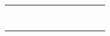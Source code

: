 \documentclass{book}
\begin{document}
\begin{center}
\begin{tabular}{|c|c|c|c|c|c|c|c|c|c|c|c }
        \cline{1-10}
        & & & & & & & & & & \\
        \cline{1-10}
        & & & & & & & & & & \\
        \cline{1-10}
        & & & & & & & & & & \\
        \cline{1-10}
        & & & & & & & & & & \\
        \cline{1-10}
        & & & & & & & & & & \\
        \cline{1-10}
        & & & & & & & & & & \\
        \cline{1-10}
        & & & & & & & & & & \\
        \cline{1-10}
        & & & & & & & & & & \\
        \cline{1-10}
    \end{tabular}
\end{center}
\newpage
{}\\
\end{document}
